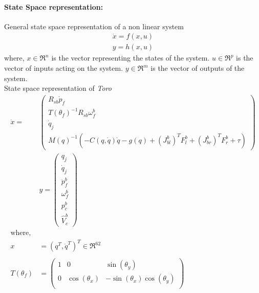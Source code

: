 \documentclass[12pt]{article}
\begin{document}
\paragraph{State Space representation:}
General state space representation of a non linear system
\begin{equation}
\label{eq:dyn_nl}
	\begin{split}
	\dot{x} = f(x,u)\\
	y = h(x,u)
	\end{split}
\end{equation}
where, $x \in \Re^{n}$ is the vector representing the states of the system. $u \in \Re^{p}$ is the vector of inputs acting on the system. $y \in \Re^{m}$ is the vector of outputs of the system.\\
State space representation of \emph{Toro}
\begin{equation}
\label{eq:toro}
	\begin{split}
	\dot{x} = &
	\begin{pmatrix}
	R_{sb}\dot{p}_f\\
	T(\theta_{f})^{-1}R_{sb}\omega_f^b \\
	\dot{q}_{j}\\
	M(q)^{-1}(-C(q,\dot{q})\dot{q} -g(q) + (J_{bl}^{b})^{T}F_{l}^{b} +(J_{br}^{b})^{T}F_{r}^{b} + \tau)	
	\end{pmatrix}
	\\&	y = 
	\begin{pmatrix}
	q_{j} \\ \dot{q}_{j} \\ \ddot{p}_{f}^b \\ \omega_{f}^{b}\\ p_{c}^{b}\\ \hat{V}_{c}^{b}
	\end{pmatrix}
	\\ \text{where, }\\ x &= (q^{T},\dot{q}^{T})^{T} \in \Re^{62}\\
	\\T(\theta_{f}) &=
	\begin{pmatrix}
	1 &0 &\sin(\theta_{y})\\
	0 &\cos(\theta_{x}) &-\sin(\theta_{x})\cos(\theta_{y})\\

\end{pmatrix}
\end{split}
\end{equation}
\end{document}
